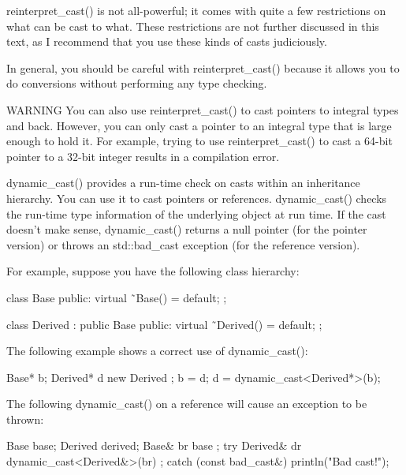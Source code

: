 reinterpret\_cast() is not all-powerful; it comes with quite a few restrictions on what can be cast to what. These restrictions are not further discussed in this text, as I recommend that you use these kinds of casts judiciously.

In general, you should be careful with reinterpret\_cast() because it allows you to do conversions without performing any type checking.

\begin{myWarning}{WARNING}
You can also use reinterpret\_cast() to cast pointers to integral types and back. However, you can only cast a pointer to an integral type that is large enough to hold it. For example, trying to use reinterpret\_cast() to cast a 64-bit pointer to a 32-bit integer results in a compilation error.
\end{myWarning}


dynamic\_cast() provides a run-time check on casts within an inheritance hierarchy. You can use it to cast pointers or references. dynamic\_cast() checks the run-time type information of the underlying object at run time. If the cast doesn’t make sense, dynamic\_cast() returns a null pointer (for the pointer version) or throws an std::bad\_cast exception (for the reference version).

For example, suppose you have the following class hierarchy:

\begin{cpp}
class Base
{
    public:
        virtual ˜Base() = default;
};

class Derived : public Base
{
    public:
        virtual ˜Derived() = default;
};
\end{cpp}

The following example shows a correct use of dynamic\_cast():

\begin{cpp}
Base* b;
Derived* d { new Derived {} };
b = d;
d = dynamic_cast<Derived*>(b);
\end{cpp}

The following dynamic\_cast() on a reference will cause an exception to be thrown:

\begin{cpp}
Base base;
Derived derived;
Base& br { base };
try {
    Derived& dr { dynamic_cast<Derived&>(br) };
} catch (const bad_cast&) {
    println("Bad cast!");
}
\end{cpp}

